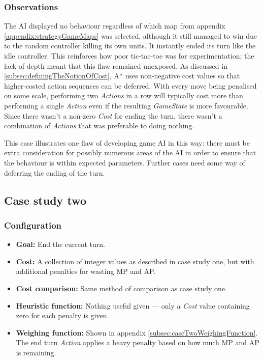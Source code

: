 \documentclass[11pt, a4paper]{report}
\begin{document}
\subsubsection{Observations}

The AI displayed no behaviour regardless of which map from appendix \ref{appendix:strategyGameMaps} was selected, although it still managed to win due to the random controller killing its own units. It instantly ended its turn like the idle controller. This reinforces how poor tic-tac-toe was for experimentation; the lack of depth meant that this flaw remained unexposed. As discussed in \ref{subsec:definingTheNotionOfCost}, A* uses non-negative cost values so that higher-costed action sequences can be deferred. With every move being penalised on some scale, performing two \emph{Actions} in a row will typically cost more than performing a single \emph{Action} even if the resulting \emph{GameState} is more favourable. Since there wasn't a non-zero \emph{Cost} for ending the turn, there wasn't a combination of \emph{Actions} that was preferable to doing nothing. 

This case illustrates one flaw of developing game AI in this way: there must be extra consideration for possibly numerous areas of the AI in order to ensure that the behaviour is within expected parameters. Further cases need some way of deferring the ending of the turn.

\subsection{Case study two}
\label{subsec:caseStudyTwo}

\subsubsection{Configuration}

\begin{itemize}
  \item \textbf{Goal:} End the current turn.
  \item \textbf{Cost:} A collection of integer values as described in case study one, but with additional penalties for wasting MP and AP.
  \item \textbf{Cost comparison:} Same method of comparison as case study one.
  \item \textbf{Heuristic function:} Nothing useful given --- only a \emph{Cost} value containing zero for each penalty is given.
  \item \textbf{Weighing function:} Shown in appendix \ref{subsec:caseTwoWeighingFunction}. The end turn \emph{Action} applies a heavy penalty based on how much MP and AP is remaining.
\end{itemize}
\end{document}
